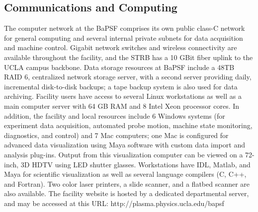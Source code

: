 \documentclass[11pt]{article}
\begin{document}
 \subsection{Communications and Computing}
The computer network at the BaPSF comprises its own public class-C network for general computing and several internal private subnets for data acquisition and machine control. Gigabit network switches and wireless connectivity are available throughout the facility, and the STRB has a 10 GBit fiber uplink to the UCLA campus backbone. 
	Data storage resources at BaPSF include a 48TB RAID 6, centralized network storage server, with a second server providing daily, incremental disk-to-disk backups; a tape backup system is also used for data archiving. Facility users have access to several Linux workstations as well as a main computer server with 64 GB RAM and 8 Intel Xeon processor cores. In addition, the facility and local resources include 6 Windows systems (for experiment data acquisition, automated probe motion, machine state monitoring, diagnostics, and control) and 7 Mac computers; one Mac is configured for advanced data visualization using Maya software with custom data import and analysis plug-ins. Output from this visualization computer can be viewed on a 72-inch, 3D HDTV using LED shutter glasses. Workstations have IDL, Matlab, and Maya for scientific visualization as well as several language compilers (C, C++, and Fortran). Two color laser printers, a slide scanner, and a flatbed scanner are also available.  The facility website is hosted by a dedicated departmental server, and may be accessed at this URL: http://plasma.physics.ucla.edu/bapsf



%
%
%
%  
\end{document}

